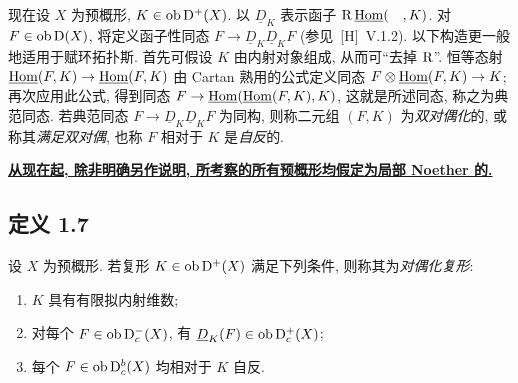 现在设 $X$ 为预概形, $K \in \operatorname{ob} \mathrm{D}^{+}(X)$. 以 $\underline{D}_K$ 表示函子 $\mathrm R\,\underline{\operatorname{Hom}}(\quad, K)$. 对 $F \in \operatorname{ob} \mathrm{D}(X)$, 将定义函子性同态 $F \to \underline{D}_K \underline{D}_K F$ (参见~[H]~V.1.2). 以下构造更一般地适用于赋环拓扑斯. 首先可假设 $K$ 由内射对象组成, 从而可“去掉 $\mathrm R$”. 恒等态射 $\underline{\operatorname{Hom}}(F,K) \to \underline{\operatorname{Hom}}(F,K)$ 由 Cartan 熟用的公式定义同态 $F \otimes \underline{\operatorname{Hom}}(F,K) \to K$; 再次应用此公式, 得到同态 $F \to \underline{\operatorname{Hom}}(\underline{\operatorname{Hom}}(F,K), K)$, 这就是所述同态, 称之为典范同态. 若典范同态 $F \to \underline{D}_K \underline{D}_K F$ 为同构, 则称二元组 $(F,K)$ 为\emph{双对偶化}的, 或称其\emph{满足双对偶}, 也称 $F$ 相对于 $K$ 是\emph{自反}的.

\textbf{\uline{从现在起, 除非明确另作说明, 所考察的所有预概形均假定为局部 Noether 的.}}

\subsection*{定义 1.7}
设 $X$ 为预概形. 若复形 $K \in \operatorname{ob} \mathrm{D}^{+}(X)$ 满足下列条件, 则称其为\emph{对偶化复形}:
\begin{enumerate}[label=(\roman*)]
\item $K$ 具有有限拟内射维数;
\item 对每个 $F \in \operatorname{ob} \mathrm{D}_c^{-}(X)$, 有 $\underline{D}_K(F) \in \operatorname{ob} \mathrm{D}_c^{+}(X)$;
\item 每个 $F \in \operatorname{ob} \mathrm{D}_c^{b}(X)$ 均相对于 $K$ 自反.
\end{enumerate}

